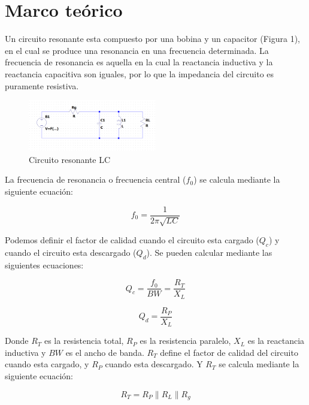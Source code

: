 \section{Marco teórico}


Un circuito resonante esta compuesto por una bobina y un capacitor (Figura 1), en el cual se produce una resonancia en una frecuencia determinada. La frecuencia de resonancia es aquella en 
la cual la reactancia inductiva y la reactancia capacitiva son iguales, por lo que la impedancia del circuito es puramente resistiva. 

\begin{figure}[h]
    \centering
    \includegraphics[width=0.5\textwidth]{Imagenes/circuito_resonante.png}
    \caption{Circuito resonante LC}
\end{figure}

La frecuencia de resonancia o frecuencia central ($f_0$) se calcula mediante la siguiente ecuación:

\begin{equation}
    f_0 = \frac{1}{2\pi \sqrt{LC}}
\end{equation}

Podemos definir el factor de calidad cuando el circuito esta cargado ($Q_c$) y cuando el circuito esta descargado ($Q_d$). 
Se pueden calcular mediante las siguientes ecuaciones:

\begin{equation}
    Q_c = \frac{f_0}{BW} = \frac{R_T}{X_L}
\end{equation}

\begin{equation}
    Q_d = \frac{R_P}{X_L}
\end{equation}

Donde $R_T$ es la resistencia total, $R_P$ es la resistencia paralelo, $X_L$ es la reactancia inductiva y $BW$ es el ancho de banda. $R_T$ define el factor de calidad del circuito 
cuando esta cargado, y $R_P$ cuando esta descargado. Y $R_T$ se calcula mediante la siguiente ecuación:

\begin{equation}
    R_T = R_P \parallel R_L \parallel R_g
\end{equation}


